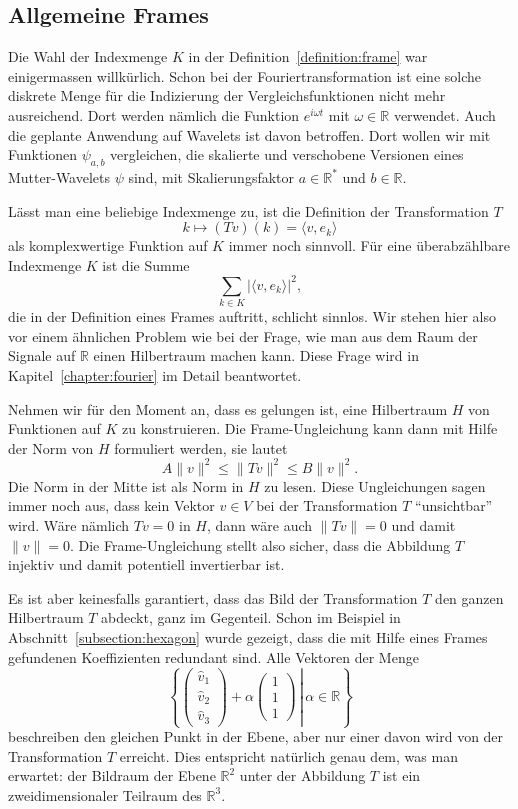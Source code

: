 \subsection{Allgemeine Frames}
Die Wahl der Indexmenge $K$ in der Definition~\ref{definition:frame}
war einigermassen willkürlich.
Schon bei der Fouriertransformation ist eine solche diskrete Menge
für die Indizierung der Vergleichsfunktionen nicht mehr ausreichend.
Dort werden nämlich die Funktion $e^{i\omega t}$ mit $\omega\in\mathbb R$
verwendet.
Auch die geplante Anwendung auf Wavelets ist davon betroffen.
Dort wollen wir mit Funktionen $\psi_{a,b}$ vergleichen, die 
skalierte und verschobene Versionen eines Mutter-Wavelets $\psi$ sind,
mit Skalierungsfaktor $a\in\mathbb R^*$ und $b\in \mathbb R$.

Lässt man eine beliebige Indexmenge zu, ist die Definition der
Transformation $T$
\[
k
\mapsto
(Tv)(k) = \langle v,e_k\rangle
\]
als komplexwertige Funktion auf $K$ immer noch sinnvoll.
Für eine überabzählbare Indexmenge $K$ ist die Summe 
\[
\sum_{k\in K} |\langle v,e_k\rangle|^2,
\]
die in der Definition eines Frames auftritt, schlicht sinnlos.
Wir stehen hier also vor einem ähnlichen Problem wie bei der Frage,
wie man aus dem Raum der Signale auf $\mathbb R$ einen Hilbertraum machen kann.
Diese Frage wird in Kapitel~\ref{chapter:fourier} im Detail beantwortet.

Nehmen wir für den Moment an, dass es gelungen ist, eine Hilbertraum $H$
von Funktionen auf $K$ zu konstruieren.
Die Frame-Ungleichung kann dann mit Hilfe der Norm von $H$ formuliert
werden, sie lautet
\[
A\|v\|^2 \le \|Tv\|^2 \le B\|v\|^2.
\]
Die Norm in der Mitte ist als Norm in $H$ zu lesen.
Diese Ungleichungen sagen immer noch aus, dass kein Vektor $v\in V$ bei
der Transformation $T$ ``unsichtbar'' wird.
Wäre nämlich $Tv=0$ in $H$, dann wäre auch $\|Tv\|=0$ und damit
$\|v\|=0$.
Die Frame-Ungleichung stellt also sicher, dass die Abbildung $T$ 
injektiv und damit potentiell invertierbar ist.

Es ist aber keinesfalls garantiert, dass das Bild der Transformation $T$
den ganzen Hilbertraum $T$ abdeckt, ganz im Gegenteil.
Schon im Beispiel in Abschnitt~\ref{subsection:hexagon} wurde gezeigt,
dass die mit Hilfe eines Frames gefundenen Koeffizienten redundant sind.
Alle Vektoren der Menge
\[
\left\{
\left.
\begin{pmatrix}\hat{v}_1\\\hat{v}_2\\\hat{v}_3\end{pmatrix}
+\alpha\begin{pmatrix}1\\1\\1\end{pmatrix}
\,
\right|\,
\alpha \in\mathbb R
\right\}
\]
beschreiben den gleichen Punkt in der Ebene, aber nur einer davon 
wird von der Transformation $T$ erreicht.
Dies entspricht natürlich genau dem, was man erwartet: der Bildraum
der Ebene $\mathbb R^2$ unter der Abbildung $T$ ist ein zweidimensionaler
Teilraum des $\mathbb R^3$.

